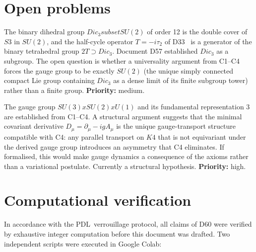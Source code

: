 \documentclass[11pt,a4paper]{article}
\def\Sthree{S3}%
\def\SUthree{SU(3)}%
\def\SUtwo{SU(2)}%
\def\Uone{U(1)}%
\def\Kfour{K4}%
\def\PDL{PDL}%
\def\times{x}%
\def\subset{ subset }%
\def\mathrm#1{#1}%
\def\mathbf#1{#1}%
\def\textsc#1{#1}%
\def\Dic{Dic}%
\newenvironment{openproblem}[1][]{%
  \begin{tcolorbox}[openproblemstyle,title={Open Problem\ifx\relax#1\relax\else:
    #1\fi}]}
  {\end{tcolorbox}}
\theoremstyle{plain}
\theoremstyle{definition}
\theoremstyle{remark}
\newcommand{\PDL}{\textsc{PDL}}
\newcommand{\Kfour}{K_4}
\newcommand{\Sthree}{S_3}
\newcommand{\SUthree}{\mathrm{SU}(3)}
\newcommand{\SUtwo}{\mathrm{SU}(2)}
\newcommand{\Uone}{\mathrm{U}(1)}
\newcommand{\Dic}{\mathrm{Dic}}
\begin{document}
\section{Open problems}
\label{sec:open}

\begin{openproblem}[OP-D57-2: $\Dic_3$ as the structural generator of the weak gauge group]
\label{op:Dic3}
The binary dihedral group $\Dic_3 \subset \SUtwo$ of order 12 is the double cover of
$\Sthree$ in $\SUtwo$, and the half-cycle operator $T = -i\tau_2$ of D33~\cite{PDL_D33}
is a generator of the binary tetrahedral group $2T \supset \Dic_3$. Document D57
established $\Dic_3$ as a subgroup. The open question is whether a universality argument
from C1--C4 forces the gauge group to be exactly $\SUtwo$ (the unique simply connected
compact Lie group containing $\Dic_3$ as a dense limit of its finite subgroup tower) rather
than a finite group. \textbf{Priority:} medium.
\end{openproblem}

\begin{openproblem}[OP-D59-2: Minimal covariant derivative as a C4 survival theorem]
\label{op:Dmu}
The gauge group $\SUthree \times \SUtwo \times \Uone$ and its fundamental representation
$\mathbf{3}$ are established from C1--C4. A structural argument suggests that the minimal
covariant derivative $D_\mu = \partial_\mu - igA_\mu$ is the unique gauge-transport
structure compatible with C4: any parallel transport on $\Kfour$ that is not equivariant
under the derived gauge group introduces an asymmetry that C4 eliminates. If formalised,
this would make gauge dynamics a consequence of the axioms rather than a variational
postulate. Currently a structural hypothesis. \textbf{Priority:} high.
\end{openproblem}

\section{Computational verification}
\label{sec:computation}

In accordance with the \PDL\ verrouillage protocol, all claims of D60 were verified by
exhaustive integer computation before this document was drafted. Two independent scripts
were executed in Google Colab:
\end{document}
